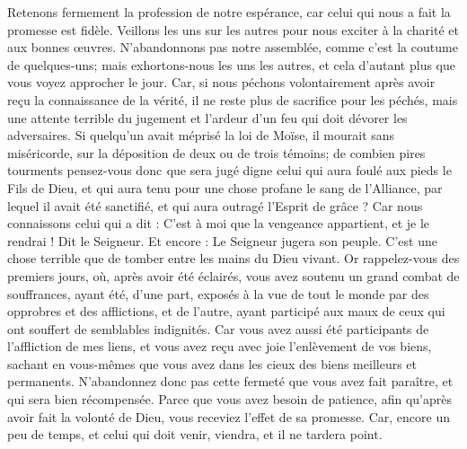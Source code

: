 \begin{multicols}{2}
Retenons fermement la profession de notre espérance, car celui qui nous a fait la promesse est fidèle.
Veillons les uns sur les autres pour nous exciter à la charité et aux bonnes œuvres.
N'abandonnons pas notre assemblée, comme c'est la coutume de quelques-uns; mais exhortons-nous les uns les autres, et cela d'autant plus que vous voyez approcher le jour.
Car, si nous péchons volontairement après avoir reçu la connaissance de la vérité, il ne reste plus de sacrifice pour les péchés,
mais une attente terrible du jugement et l'ardeur d'un feu qui doit dévorer les adversaires.
Si quelqu'un avait méprisé la loi de Moïse, il mourait sans miséricorde, sur la déposition de deux ou de trois témoins;
de combien pires tourments pensez-vous donc  que sera jugé digne celui qui aura foulé aux pieds le Fils de Dieu, et qui aura tenu pour une chose profane le sang de l'Alliance, par lequel il avait été sanctifié, et qui aura outragé l'Esprit de grâce ?
Car nous connaissons celui qui a dit : C'est à moi que la vengeance appartient, et je le rendrai ! Dit le Seigneur. Et encore : Le Seigneur jugera son peuple.
C'est une chose terrible que de tomber entre les mains du Dieu vivant.
Or rappelez-vous des premiers jours, où, après avoir été éclairés, vous avez soutenu un grand combat de souffrances,
ayant été, d'une part, exposés à la vue de tout le monde par des opprobres et des afflictions, et de l'autre, ayant participé aux maux de ceux qui ont souffert de semblables indignités.
Car vous avez aussi été participants de l'affliction de mes liens, et vous avez reçu avec joie l'enlèvement de vos biens, sachant en vous-mêmes que vous avez dans les cieux des biens meilleurs et permanents.
N'abandonnez donc pas cette fermeté que vous avez fait paraître, et qui sera bien récompensée.
Parce que vous avez besoin de patience, afin qu'après avoir fait la volonté de Dieu, vous receviez l'effet de sa promesse.
Car, encore un peu de temps, et celui qui doit venir, viendra, et il ne tardera point.

\end{multicols}
